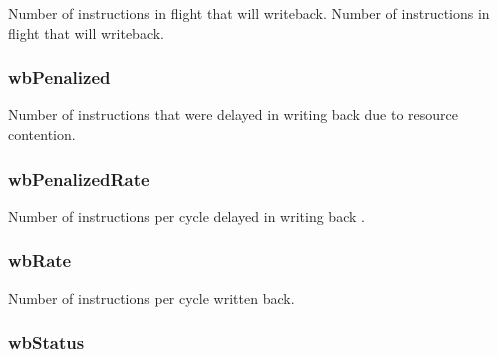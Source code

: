 \label{classDefaultIEW_a225199c05fd7bddaf95d0d79171b31dc}
Number of instructions in flight that will writeback. Number of instructions in flight that will writeback. \hypertarget{classDefaultIEW_a364daa8f3a358e41aa13fac115bb5e0f}{
\subsubsection[{wbPenalized}]{ {\bf wbPenalized}}}
\label{classDefaultIEW_a364daa8f3a358e41aa13fac115bb5e0f}
Number of instructions that were delayed in writing back due to resource contention. \hypertarget{classDefaultIEW_a58a4cd085d39435e69bc1ee729422d84}{
\subsubsection[{wbPenalizedRate}]{ {\bf wbPenalizedRate}}}
\label{classDefaultIEW_a58a4cd085d39435e69bc1ee729422d84}
Number of instructions per cycle delayed in writing back . \hypertarget{classDefaultIEW_a5ab2bb9fa8eb98a735a204082a37c9db}{
\subsubsection[{wbRate}]{ {\bf wbRate}}}
\label{classDefaultIEW_a5ab2bb9fa8eb98a735a204082a37c9db}
Number of instructions per cycle written back. \hypertarget{classDefaultIEW_abc3a4c25708a2663da1d26bf7fc045a0}{
\subsubsection[{wbStatus}]{ {\bf wbStatus}}}
